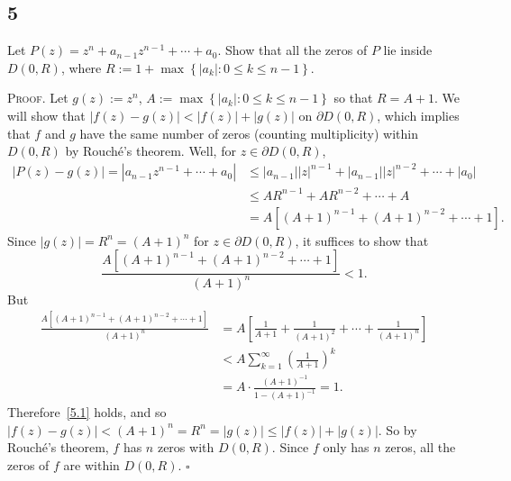 \documentclass[12pt]{article}
\newcounter{ProofCounter}
\newenvironment{Proof}{\stepcounter{ProofCounter}\textsc{Proof.}}{\hfill$\square$}
\begin{document}
\subsection*{5}
\begin{tcolorbox}
  Let $P(z) = z^n + a_{n-1}z^{n-1} + \cdots + a_0$. Show that all the zeros of $P$ lie inside $D(0,R)$, where $R := 1 + \max\left\{ 
  |a_k| : 0 \leq k \leq n-1\right\}$.
\end{tcolorbox}
\begin{Proof}
  Let $g(z) := z^{n}$, $A := \max\left\{ |a_k| : 0\leq k \leq n-1 \right\}$ so that $R = A + 1$. We will show that $|f(z) - g(z)| < |f(z)| + |g(z)|$ on
  $\partial D(0,R)$, which implies that $f$ and $g$ have the same number of zeros (counting multiplicity) within $D(0,R)$ by Rouch\'{e}'s theorem.
  Well, for $z \in \partial D(0,R)$,
  \begin{align*}
    |P(z) - g(z)| = |a_{n-1}z^{n-1} + \cdots + a_0| & \leq |a_{n-1}||z|^{n-1} + |a_{n-1}||z|^{n-2} + \cdots + |a_{0}| \\
    & \leq AR^{n-1} + AR^{n-2} + \cdots + A \\
    & = A[(A+1)^{n-1} + (A + 1)^{n-2} + \cdots + 1].
  \end{align*}
  Since $|g(z)| = R^{n} = (A + 1)^{n}$ for $z\in \partial D(0,R)$, it suffices to show that 
  \begin{equation}
    \frac{A[(A+1)^{n-1} + (A + 1)^{n-2} + \cdots + 1]}{(A + 1)^{n}} < 1.
    \label{5.1}
  \end{equation}
  But 
  \begin{align*}
    \frac{A[(A+1)^{n-1} + (A + 1)^{n-2} + \cdots + 1]}{(A + 1)^{n}} & = A\left[ \frac{1}{A+1} + \frac{1}{(A+1)^{2}} + \cdots + \frac{1}{(A+1)^{n}}
    \right] \\
    & < A\sum_{k=1}^{\infty}\left( \frac{1}{A + 1} \right)^{k} \\
    & = A\cdot \frac{(A + 1)^{-1}}{1 - (A+1)^{-1}} = 1.
  \end{align*}
  Therefore~\eqref{5.1} holds, and so $|f(z) - g(z)| < (A + 1)^{n} = R^{n} = |g(z)| \leq |f(z)| + |g(z)|$. So by Rouch\'{e}'s theorem, $f$ has $n$
  zeros with $D(0,R)$. Since $f$ only has $n$ zeros, all the zeros of $f$ are within $D(0,R)$.
\end{Proof}


\newpage 
\end{document}
